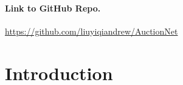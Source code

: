 \documentclass{article}
\begin{document}
\paragraph{Link to GitHub Repo.} \url{https://github.com/liuyiqiandrew/AuctionNet}
%
%
%

\section{Introduction}
\end{document}
